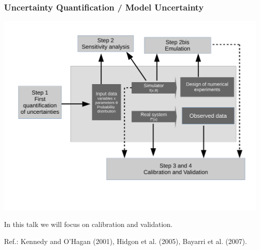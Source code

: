 \documentclass[nopagenumber,9pt]{beamer}
\begin{document}
\begin{frame}
\frametitle{Uncertainty Quantification / Model Uncertainty}

{\centering
\includegraphics[scale=.25]{SchemaUQ.pdf}}


In this talk we will focus on calibration and validation.

\bigskip

Ref.: \color{blue} Kennedy and O'Hagan (2001), Hidgon et al. (2005), Bayarri et al. (2007)\color{black}.


\end{frame}
\end{document}
